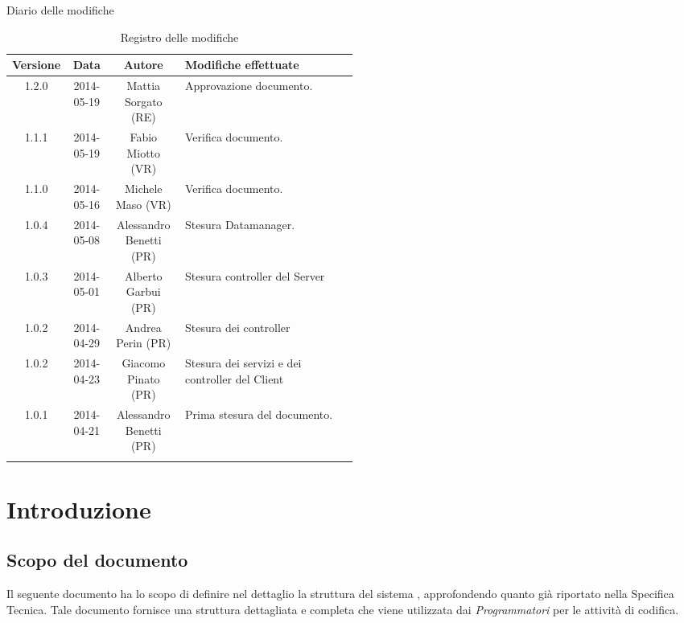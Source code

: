 
\newpage
Diario delle modifiche
\begin{center}
\begin{longtable}{|c|c|c|p{0.5\linewidth}|}
\toprule
\textbf{Versione} & \textbf{Data} & \textbf{Autore} & \textbf{Modifiche effettuate}\\

\midrule
1.2.0 & 2014-05-19 & Mattia Sorgato (RE) & Approvazione documento.\\
\midrule
1.1.1 & 2014-05-19 & Fabio Miotto (VR) & Verifica documento.\\
\midrule
1.1.0 & 2014-05-16 & Michele Maso (VR) & Verifica documento.\\
\midrule

1.0.4 & 2014-05-08 & Alessandro Benetti (PR) & Stesura Datamanager.\\
\midrule
1.0.3 & 2014-05-01 & Alberto Garbui (PR) & Stesura controller del Server\\
\midrule
1.0.2 & 2014-04-29 & Andrea Perin (PR) & Stesura dei controller\\
\midrule
1.0.2 & 2014-04-23 & Giacomo Pinato (PR) & Stesura dei servizi e dei controller del Client\\
\midrule
1.0.1 & 2014-04-21 & Alessandro Benetti (PR) & Prima stesura del documento.\\

\bottomrule
\caption{Registro delle modifiche}
\label{tab:changelog}

\end{longtable}
\end{center}

\newpage
\tableofcontents

\newpage
\listoffigures %

\newpage
\section{Introduzione}
\subsection{Scopo del documento}
Il seguente documento ha lo scopo di definire nel dettaglio la struttura del sistema , approfondendo quanto già riportato 
nella Specifica Tecnica. Tale documento fornisce una struttura dettagliata e completa che viene utilizzata dai \emph{Programmatori} per le 
attività di codifica.

